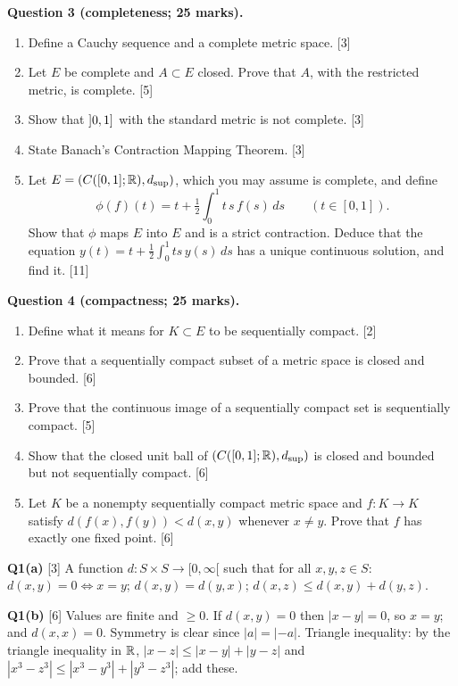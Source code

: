 \textbf{Question 3 (completeness; 25 marks).}
\begin{enumerate}[label=(\alph*)]
\item Define a Cauchy sequence and a complete metric space. \hfill[3]
\item Let $E$ be complete and $A\subset E$ closed. Prove that $A$, with the restricted metric,
  is complete. \hfill[5]
\item Show that $\mathopen{]}0,1\mathclose{]}$ with the standard metric is not complete. \hfill[3]
\item State Banach's Contraction Mapping Theorem. \hfill[3]
\item Let $E=(C([0,1];\mathbb R),d_{\sup})$, which you may assume is complete, and define
  \[\phi(f)(t)=t+\tfrac12\int_0^1 t\,s\,f(s)\,ds\qquad(t\in[0,1]).\]
  Show that $\phi$ maps $E$ into $E$ and is a strict contraction. Deduce that the equation
  $y(t)=t+\frac12\int_0^1ts\,y(s)\,ds$ has a unique continuous solution, and find it. \hfill[11]
\end{enumerate}

\textbf{Question 4 (compactness; 25 marks).}
\begin{enumerate}[label=(\alph*)]
\item Define what it means for $K\subset E$ to be sequentially compact. \hfill[2]
\item Prove that a sequentially compact subset of a metric space is closed and bounded. \hfill[6]
\item Prove that the continuous image of a sequentially compact set is sequentially compact. \hfill[5]
\item Show that the closed unit ball of $(C([0,1];\mathbb R),d_{\sup})$ is closed and bounded but not
  sequentially compact. \hfill[6]
\item Let $K$ be a nonempty sequentially compact metric space and $f:K\to K$ satisfy
  $d(f(x),f(y))<d(x,y)$ whenever $x\ne y$. Prove that $f$ has exactly one fixed point. \hfill[6]
\end{enumerate}

\clearpage
{}

\textbf{Q1(a)} [3] A function $d:S\times S\to[0,\infty[$ such that for all $x,y,z\in S$:
$d(x,y)=0\iff x=y$; $d(x,y)=d(y,x)$; $d(x,z)\le d(x,y)+d(y,z)$.

\textbf{Q1(b)} [6] Values are finite and $\ge0$. If $d(x,y)=0$ then $|x-y|=0$, so $x=y$;
and $d(x,x)=0$. Symmetry is clear since $|a|=|-a|$. Triangle inequality: by the triangle
inequality in $\mathbb R$,
$|x-z|\le|x-y|+|y-z|$ and $|x^3-z^3|\le|x^3-y^3|+|y^3-z^3|$; add these.

